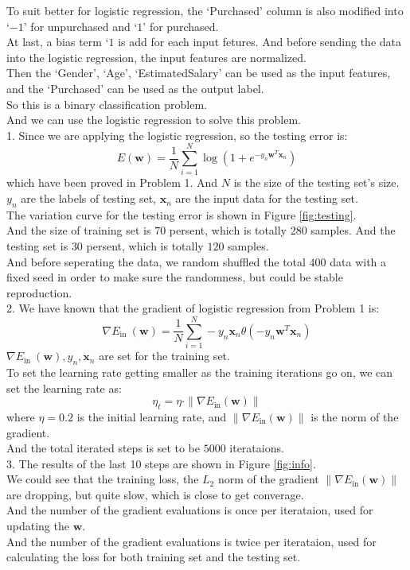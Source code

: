 To suit better for logistic regression, the `Purchased' column is also modified into `$-1$' for unpurchased and `$1$' for purchased.\\
At last, a bias term `$1$ is add for each input fetures. 
And before sending the data into the logistic regression, the input features are normalized.\\

Then the `Gender', `Age', `EstimatedSalary' can be used as the input features, and the `Purchased' can be used as the output label.\\
So this is a binary classification problem.\\
And we can use the logistic regression to solve this problem.\\

1. Since we are applying the logistic regression, so the testing error is:
$$E(\mathbf{w}) = \dfrac{1}{N}\sum_{i=1}^{N}\log (1+e^{-y_n\mathbf{w}^T\mathbf{x}_n})$$
which have been proved in Problem 1. And $N$ is the size of the testing set's size. $y_n$ are the labels of
testing set, $\mathbf{x}_n$ are the input data for the testing set.\\
The variation curve for the testing error is shown in Figure \ref{fig:testing}.\\

And the size of training set is $70$ persent, which is totally $280$ samples. And the testing set is $30$ persent, which is totally $120$ samples.\\
And before seperating the data, we random shuffled the total $400$ data with a fixed seed in order to make sure the randomness, but could be stable reproduction.\\

2. We have known that the gradient of logistic regression from Problem 1 is:
$$\nabla E_{\text {in }}(\mathbf{w}) = \dfrac{1}{N}\sum_{i=1}^{N}-y_n\mathbf{x}_n\theta(-y_n\mathbf{w}^T\mathbf{x}_n)$$
$\nabla E_{\text {in }}(\mathbf{w}),y_n,\mathbf{x}_n$ are set for the training set.\\
To set the learning rate getting smaller as the training iterations go on, we can set the learning rate as:
$$\eta_t = \eta\cdot \|\nabla E_{\text{in}}(\mathbf{w})\|$$
where $\eta=0.2$ is the initial learning rate, and $\|\nabla E_{\text{in}}(\mathbf{w})\|$ is the norm of the gradient.\\
And the total iterated steps is set to be $5000$ iterataions.\\ 

3. The results of the last 10 steps are shown in Figure \ref{fig:info}.\\
We could see that the training loss, the $L_2$ norm of the gradient $\|\nabla E_{\text{in}}(\mathbf{w})\|$ are dropping, but quite slow, which is close to get converage.\\
And the number of the gradient evaluations is once per iterataion, used for updating the $\mathbf{w}$.\\
And the number of the gradient evaluations is twice per iterataion, used for calculating the loss for both training set and the testing set.\\

